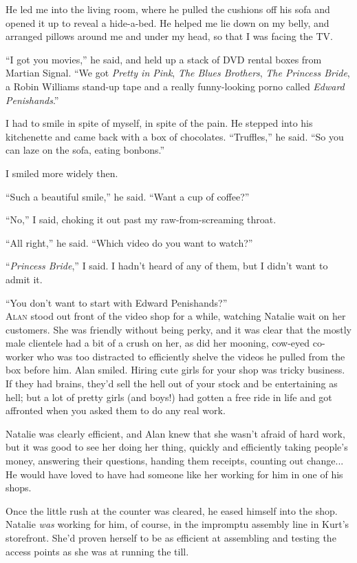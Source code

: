 \documentclass{article}
\begin{document}
He led me into the living room, where he pulled the cushions off his
sofa and opened it up to reveal a hide-a-bed.  He helped me lie down
on my belly, and arranged pillows around me and under my head, so that
I was facing the TV.

``I got you movies,'' he said, and held up a stack of DVD rental boxes
from Martian Signal.  ``We got \textit{Pretty in Pink}, \textit{The
Blues Brothers}, \textit{The Princess Bride}, a Robin Williams
stand-up tape and a really funny-looking porno called \textit{Edward
Penishands}.''

I had to smile in spite of myself, in spite of the pain.  He stepped
into his kitchenette and came back with a box of chocolates. 
``Truffles,'' he said.  ``So you can laze on the sofa, eating
bonbons.''

I smiled more widely then.

``Such a beautiful smile,'' he said.  ``Want a cup of coffee?''

``No,'' I said, choking it out past my raw-from-screaming throat.

``All right,'' he said.  ``Which video do you want to watch?''

``\textit{Princess Bride},'' I said.  I hadn't heard of any of them,
but I didn't want to admit it.

``You don't want to start with Edward Penishands?''
\\
\lettrine[lines=3, lhang=.5, nindent=0pt, findent=2pt]{A}{lan} stood out front of the video shop for a while, watching Natalie
wait on her customers.  She was friendly without being perky, and it
was clear that the mostly male clientele had a bit of a crush on her,
as did her mooning, cow-eyed co-worker who was too distracted to
efficiently shelve the videos he pulled from the box before him.  Alan
smiled.  Hiring cute girls for your shop was tricky business.  If they
had brains, they'd sell the hell out of your stock and be entertaining
as hell; but a lot of pretty girls (and boys!) had gotten a free ride
in life and got affronted when you asked them to do any real work.

Natalie was clearly efficient, and Alan knew that she wasn't afraid of
hard work, but it was good to see her doing her thing, quickly and
efficiently taking people's money, answering their questions, handing
them receipts, counting out change...  He would have loved to have had
someone like her working for him in one of his shops.

Once the little rush at the counter was cleared, he eased himself into
the shop.  Natalie \textit{was} working for him, of course, in the
impromptu assembly line in Kurt's storefront.  She'd proven herself to
be as efficient at assembling and testing the access points as she was
at running the till.
\end{document}

